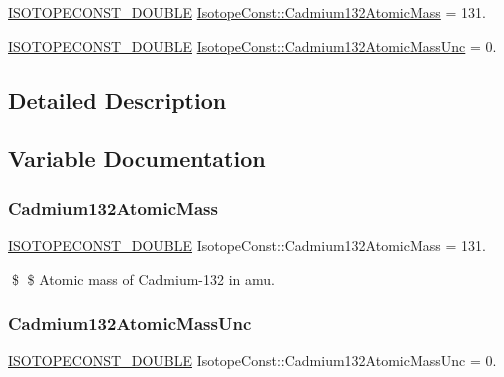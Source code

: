 \begin{DoxyCompactItemize}
\item 
\mbox{\hyperlink{group___isotope_const-_macros_ga8f45a7272ce02c0b4c65c44636ed719a}{I\+S\+O\+T\+O\+P\+E\+C\+O\+N\+S\+T\+\_\+\+D\+O\+U\+B\+LE}} \mbox{\hyperlink{group___isotope_const-_cadmium-_cd132_ga3424fb388dae078938a6d2a14dc56958}{Isotope\+Const\+::\+Cadmium132\+Atomic\+Mass}} = 131.
\item 
\mbox{\hyperlink{group___isotope_const-_macros_ga8f45a7272ce02c0b4c65c44636ed719a}{I\+S\+O\+T\+O\+P\+E\+C\+O\+N\+S\+T\+\_\+\+D\+O\+U\+B\+LE}} \mbox{\hyperlink{group___isotope_const-_cadmium-_cd132_ga36a122be26e5d01981dd7888cd8c80c7}{Isotope\+Const\+::\+Cadmium132\+Atomic\+Mass\+Unc}} = 0.
\end{DoxyCompactItemize}


\subsection{Detailed Description}


\subsection{Variable Documentation}
\mbox{\label{group___isotope_const-_cadmium-_cd132_ga3424fb388dae078938a6d2a14dc56958}} 
\subsubsection{\texorpdfstring{Cadmium132\+Atomic\+Mass}{Cadmium132AtomicMass}}
{\footnotesize\ttfamily \mbox{\hyperlink{group___isotope_const-_macros_ga8f45a7272ce02c0b4c65c44636ed719a}{I\+S\+O\+T\+O\+P\+E\+C\+O\+N\+S\+T\+\_\+\+D\+O\+U\+B\+LE}} Isotope\+Const\+::\+Cadmium132\+Atomic\+Mass = 131.}

\$ \$ Atomic mass of Cadmium-\/132 in amu. \mbox{\label{group___isotope_const-_cadmium-_cd132_ga36a122be26e5d01981dd7888cd8c80c7}} 
\subsubsection{\texorpdfstring{Cadmium132\+Atomic\+Mass\+Unc}{Cadmium132AtomicMassUnc}}
{\footnotesize\ttfamily \mbox{\hyperlink{group___isotope_const-_macros_ga8f45a7272ce02c0b4c65c44636ed719a}{I\+S\+O\+T\+O\+P\+E\+C\+O\+N\+S\+T\+\_\+\+D\+O\+U\+B\+LE}} Isotope\+Const\+::\+Cadmium132\+Atomic\+Mass\+Unc = 0.}

